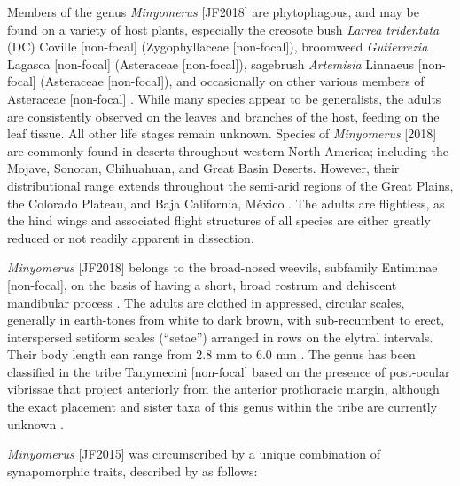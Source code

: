\documentclass[fleqn,10pt,lineno]{wlpeerj} %
\begin{document}
	Members of the genus \textit{Minyomerus} [JF2018] are phytophagous, and may be found on a variety of host plants, especially the creosote bush \textit{Larrea tridentata} (DC) Coville [non-focal] (Zygophyllaceae [non-focal]), broomweed \textit{Gutierrezia} Lagasca [non-focal] (Asteraceae [non-focal]), sagebrush \textit{Artemisia} Linnaeus [non-focal] (Asteraceae [non-focal]), and occasionally on other various members of Asteraceae [non-focal] \citep{jansen2015}. 
	While many species appear to be generalists, the adults are consistently observed on the leaves and branches of the host, feeding on the leaf tissue. All other life stages remain unknown.
	Species of \textit{Minyomerus} [2018] are commonly found in deserts throughout western North America; including the Mojave, Sonoran, Chihuahuan, and Great Basin Deserts.
	However, their distributional range extends throughout the semi-arid regions of the Great Plains, the Colorado Plateau, and Baja California, M\'{e}xico \citep{obrien1982, jansen2015}. 
	The adults are flightless, as the hind wings and associated flight structures of all species are either greatly reduced or not readily apparent in dissection.
		
	\textit{Minyomerus} [JF2018] belongs to the broad-nosed weevils, subfamily Entiminae [non-focal], on the basis of having a short, broad rostrum and dehiscent mandibular process \citep{marvaldi1997, anderson2002, oberprieler2007, oberprieler2014, marvaldi2014}.
	The adults are clothed in appressed, circular scales, generally in earth-tones from white to dark brown, with sub-recumbent to erect, interspersed setiform scales (``setae'') arranged in rows on the elytral intervals. Their body length can range from 2.8 mm to 6.0 mm \citep{jansen2015}.
	The genus has been classified in the tribe Tanymecini [non-focal] based on the presence of post-ocular vibrissae that project anteriorly from the anterior prothoracic margin, although the exact placement and sister taxa of this genus within the tribe are currently unknown \citep{howden1959, howden1970, howden1982, jansen2015}.
		
	\textit{Minyomerus} [JF2015] was circumscribed by a unique combination of synapomorphic traits, described by \citet{jansen2015} as follows:
	
\end{document}
